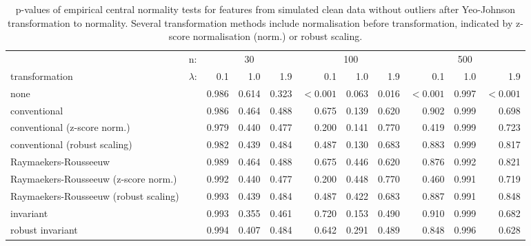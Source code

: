 \documentclass[
  a4paper,
]{article}
\begin{document}
\begin{table}
\begin{center}
\caption{
p-values of empirical central normality tests for features from simulated clean data without outliers after Yeo-Johnson transformation to normality.
Several transformation methods include normalisation before transformation, indicated by z-score normalisation (norm.) or robust scaling.}
\label{tab:clean-transformation-p-value-appendix}
\small{
\begin{tabular}{p{3.5cm} | l r r r r r r r r r}

\toprule
& n: & \multicolumn{3}{c}{30} & \multicolumn{3}{c}{100} & \multicolumn{3}{c}{500} \\
transformation & $\lambda$: & 0.1 & 1.0 & 1.9 & 0.1 & 1.0 & 1.9 & 0.1 & 1.0 & 1.9 \\

\midrule

none                                  & & 0.986 & 0.614 & 0.323 & $<0.001$ & 0.063 & 0.016 & $<0.001$ & 0.997 & $<0.001$ \\
conventional                          & & 0.986 & 0.464 & 0.488 &   0.675  & 0.139 & 0.620 &   0.902  & 0.999 &   0.698 \\
conventional (z-score norm.)          & & 0.979 & 0.440 & 0.477 &   0.200  & 0.141 & 0.770 &   0.419  & 0.999 &   0.723 \\
conventional (robust scaling)         & & 0.982 & 0.439 & 0.484 &   0.487  & 0.130 & 0.683 &   0.883  & 0.999 &   0.817 \\
Raymaekers-Rousseeuw                  & & 0.989 & 0.464 & 0.488 &   0.675  & 0.446 & 0.620 &   0.876  & 0.992 &   0.821 \\
Raymaekers-Rousseeuw (z-score norm.)  & & 0.992 & 0.440 & 0.477 &   0.200  & 0.448 & 0.770 &   0.460  & 0.991 &   0.719 \\
Raymaekers-Rousseeuw (robust scaling) & & 0.993 & 0.439 & 0.484 &   0.487  & 0.422 & 0.683 &   0.887  & 0.991 &   0.848 \\
invariant                             & & 0.993 & 0.355 & 0.461 &   0.720  & 0.153 & 0.490 &   0.910  & 0.999 &   0.682 \\
robust invariant                      & & 0.994 & 0.407 & 0.484 &   0.642  & 0.291 & 0.489 &   0.848  & 0.996 &   0.628 \\
\bottomrule
\end{tabular}
}
\end{center}
\end{table}
\end{document}
